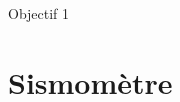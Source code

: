\documentclass[12pt, fleqn]{book}
\begin{document}
\begin{objectif}
\item Objectif 1
\end{objectif}
\section{Sismomètre}
\begin{exlist}
\item \lipsum[1]
\item \lipsum[2]
\end{exlist}
\lipsum[1-10]
\end{document}
